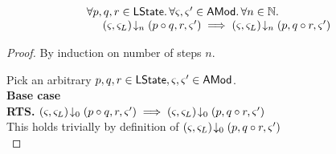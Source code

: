 %
%

%
%
\begin{lemma}\label{lemma:contextSwitch}
%
\[
\begin{array}{l}
	\forall p, q, r \in \textsf{LState}.\, \forall \varsigma_{}, \varsigma_{}' \in \textsf{AMod}.\, \forall n \in \mathbb{N}.\,\\
	\hspace*{0.5cm} \left(\varsigma_{}, \varsigma_{L}\right) \!\downarrow_{n} \left(p \circ q, r, \varsigma_{}'\right) \implies 
									\left(\varsigma_{}, \varsigma_{L}\right) \!\downarrow_{n} \left(p, q \circ r, \varsigma_{}'\right)
\end{array}
\]
%
\begin{proof} By induction on number of steps $n$.

\noindent Pick an arbitrary $p, q, r \in \textsf{LState}, \varsigma_{}, \varsigma_{}' \in \textsf{AMod}$.\\

\noindent\textbf{Base case}\\
\textbf{RTS. }\hspace*{0.5cm}$\left(\varsigma_{}, \varsigma_{L}\right) \!\downarrow_{0} \left(p \circ q, r, \varsigma_{}'\right) \implies \left(\varsigma_{}, \varsigma_{L}\right) \!\downarrow_{0} \left(p, q \circ r, \varsigma_{}'\right)$\\
This holds trivially by definition of $\left(\varsigma_{}, \varsigma_{L}\right) \!\downarrow_{0} \left(p, q \circ r, \varsigma_{}'\right)$\\


\end{proof}
\end{lemma}
